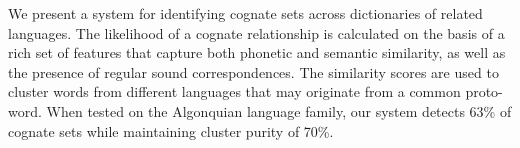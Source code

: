 We present a system for identifying cognate sets across dictionaries of related languages. The likelihood of a cognate relationship is calculated on the basis of a rich set of features that capture both phonetic and semantic similarity, as well as the presence of regular sound correspondences. The similarity scores are used to cluster words from different languages that may originate from a common proto-word. When tested on the Algonquian language family, our system detects 63\% of cognate sets while maintaining cluster purity of 70\%.

